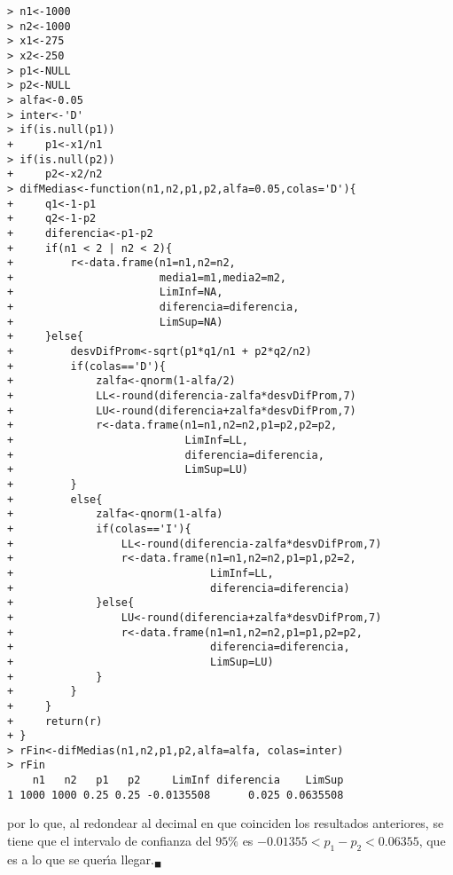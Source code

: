 \begin{solucion}
 \begin{verbatim}
> n1<-1000
> n2<-1000
> x1<-275
> x2<-250
> p1<-NULL
> p2<-NULL
> alfa<-0.05
> inter<-'D'
> if(is.null(p1))
+     p1<-x1/n1
> if(is.null(p2))
+     p2<-x2/n2
> difMedias<-function(n1,n2,p1,p2,alfa=0.05,colas='D'){
+     q1<-1-p1
+     q2<-1-p2
+     diferencia<-p1-p2
+     if(n1 < 2 | n2 < 2){
+         r<-data.frame(n1=n1,n2=n2,
+                       media1=m1,media2=m2,
+                       LimInf=NA,
+                       diferencia=diferencia,
+                       LimSup=NA)
+     }else{
+         desvDifProm<-sqrt(p1*q1/n1 + p2*q2/n2)
+         if(colas=='D'){
+             zalfa<-qnorm(1-alfa/2)
+             LL<-round(diferencia-zalfa*desvDifProm,7)
+             LU<-round(diferencia+zalfa*desvDifProm,7)
+             r<-data.frame(n1=n1,n2=n2,p1=p2,p2=p2,
+                           LimInf=LL,
+                           diferencia=diferencia,
+                           LimSup=LU)
+         }
+         else{
+             zalfa<-qnorm(1-alfa)
+             if(colas=='I'){
+                 LL<-round(diferencia-zalfa*desvDifProm,7)
+                 r<-data.frame(n1=n1,n2=n2,p1=p1,p2=2,
+                               LimInf=LL,
+                               diferencia=diferencia)
+             }else{
+                 LU<-round(diferencia+zalfa*desvDifProm,7)
+                 r<-data.frame(n1=n1,n2=n2,p1=p1,p2=p2,
+                               diferencia=diferencia,
+                               LimSup=LU)
+             }
+         }
+     }
+     return(r)
+ }
> rFin<-difMedias(n1,n2,p1,p2,alfa=alfa, colas=inter)
> rFin
    n1   n2   p1   p2     LimInf diferencia    LimSup
1 1000 1000 0.25 0.25 -0.0135508      0.025 0.0635508
 \end{verbatim}
 \vspace{-0.5cm}
 por lo que, al redondear al decimal en que coinciden los resultados anteriores, se tiene que el intervalo de confianza del $95\%$ es $-0.01355 < p_1 - p_2 < 0.06355$, que es a lo que se quer\'{\i}a llegar.${}_{\blacksquare}$
\end{solucion}
